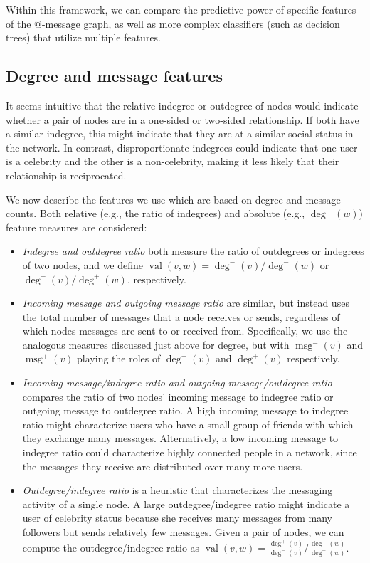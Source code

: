 \documentclass[conference]{IEEEtran}
\begin{document}
Within this framework, we can compare the predictive power of specific features of the @-message graph, as well as more complex classifiers (such as decision trees) that utilize multiple features.

\subsection{Degree and message features}
It seems intuitive that the relative indegree or outdegree of nodes would indicate whether a pair of nodes are in a one-sided or two-sided relationship. 
If both have a similar indegree, this might indicate that they are at a similar social status in the network. 
In contrast, disproportionate indegrees could indicate that one user is a celebrity and the other is a non-celebrity, making it less likely that their relationship is reciprocated.

We now describe the features we use which are based on degree and message counts.  
Both relative (e.g., the ratio of indegrees) and absolute (e.g., $\deg^-(w)$) feature measures are considered:

\begin{itemize}
\item \emph{Indegree and outdegree ratio} both measure the ratio of outdegrees or indegrees of two nodes, and we define $\operatorname{val}(v,w) = \deg^-(v)/\deg^-(w)$ or $\deg^+(v)/\deg^+(w)$, respectively.

\item \emph{Incoming message and outgoing message ratio} are similar,
but instead uses the total number of messages that a node receives or
sends, regardless of which nodes messages are sent to or received from. 
Specifically, we use the analogous measures
discussed just above for degree, but with 
$\operatorname{msg}^-(v)$ and $\operatorname{msg}^+(v)$ playing
the roles of $\deg^-(v)$ and $\deg^+(v)$ respectively.

\item \emph{Incoming message/indegree ratio and outgoing message/outdegree ratio} compares the ratio of two nodes' incoming message to indegree ratio or outgoing message to outdegree ratio. 
A high incoming message to indegree ratio might characterize users who have a small group of friends with which they exchange many messages.
Alternatively, a low incoming message to indegree ratio could characterize highly connected 
people in a network, since the messages they receive are distributed over many more users.

\item \emph{Outdegree/indegree ratio} is a heuristic that characterizes the messaging activity of a single node.  
A large outdegree/indegree ratio might indicate a user of celebrity status because she receives many messages from many followers  
but sends relatively few messages. 
Given a pair of nodes, we can compute the outdegree/indegree ratio as $\operatorname{val}(v,w) = \frac{\deg^+(v)}{\deg^-(v)} / \frac{\deg^+(w)}{\deg^-(w)}$.
\end{itemize}
\end{document}
